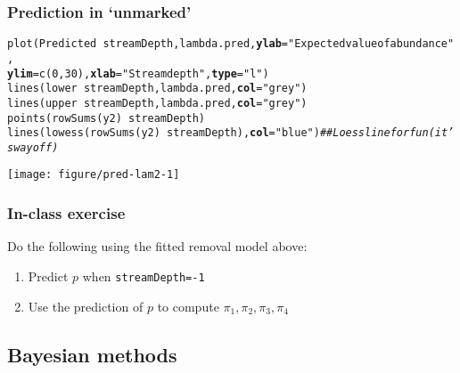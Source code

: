 \documentclass[color=usenames,dvipsnames]{beamer}\usepackage[]{graphicx}\usepackage[]{color}
\makeatletter
\newcommand{\hlnum}[1]{\textcolor[rgb]{0.69,0.494,0}{#1}}%
\newcommand{\hlstr}[1]{\textcolor[rgb]{0.749,0.012,0.012}{#1}}%
\newcommand{\hlcom}[1]{\textcolor[rgb]{0.514,0.506,0.514}{\textit{#1}}}%
\newcommand{\hlopt}[1]{\textcolor[rgb]{0,0,0}{#1}}%
\newcommand{\hlstd}[1]{\textcolor[rgb]{0,0,0}{#1}}%
\newcommand{\hlkwc}[1]{\textcolor[rgb]{0,0,0}{\textbf{#1}}}%
\newcommand{\hlkwd}[1]{\textcolor[rgb]{0.004,0.004,0.506}{#1}}%
\newenvironment{kframe}{%
 \def\at@end@of@kframe{}%
 \ifinner\ifhmode%
  \def\at@end@of@kframe{\end{minipage}}%
  \begin{minipage}{\columnwidth}%
 \fi\fi%
 \def\FrameCommand##1{\hskip\@totalleftmargin \hskip-\fboxsep
 \colorbox{shadecolor}{##1}\hskip-\fboxsep
     \hskip-\linewidth \hskip-\@totalleftmargin \hskip\columnwidth}%
 \MakeFramed {\advance\hsize-\width
   \@totalleftmargin\z@ \linewidth\hsize
   \@setminipage}}%
 {\par\unskip\endMakeFramed%
 \at@end@of@kframe}
\newenvironment{knitrout}{}{} %
\makeatother
\begin{document}
\begin{frame}[fragile]
  \frametitle{Prediction in `unmarked'}
\begin{knitrout}\tiny
{}\color{fgcolor}\begin{kframe}
\begin{alltt}
\hlkwd{plot}\hlstd{(Predicted} \hlopt{~} \hlstd{streamDepth, lambda.pred,} \hlkwc{ylab}\hlstd{=}\hlstr{"Expected value of abundance"}\hlstd{,}
     \hlkwc{ylim}\hlstd{=}\hlkwd{c}\hlstd{(}\hlnum{0}\hlstd{,}\hlnum{30}\hlstd{),} \hlkwc{xlab}\hlstd{=}\hlstr{"Stream depth"}\hlstd{,} \hlkwc{type}\hlstd{=}\hlstr{"l"}\hlstd{)}
\hlkwd{lines}\hlstd{(lower} \hlopt{~} \hlstd{streamDepth, lambda.pred,} \hlkwc{col}\hlstd{=}\hlstr{"grey"}\hlstd{)}
\hlkwd{lines}\hlstd{(upper} \hlopt{~} \hlstd{streamDepth, lambda.pred,} \hlkwc{col}\hlstd{=}\hlstr{"grey"}\hlstd{)}
\hlkwd{points}\hlstd{(}\hlkwd{rowSums}\hlstd{(y2)}\hlopt{~}\hlstd{streamDepth)}
\hlkwd{lines}\hlstd{(}\hlkwd{lowess}\hlstd{(}\hlkwd{rowSums}\hlstd{(y2)}\hlopt{~}\hlstd{streamDepth),} \hlkwc{col}\hlstd{=}\hlstr{"blue"}\hlstd{)}  \hlcom{## Loess line for fun (it's way off)}
\end{alltt}
\end{kframe}

{\centering \texttt{[image: figure/pred-lam2-1]} 

}



\end{knitrout}
\end{frame}







\begin{frame}[fragile]
  \frametitle{In-class exercise}
  Do the following using the fitted removal model above:
  \begin{enumerate}
    \normalsize
    \item Predict $p$ when \verb+streamDepth=-1+
    \item Use the prediction of $p$ to compute $\pi_1, \pi_2, \pi_3, \pi_4$
  \end{enumerate}
\end{frame}


\subsection{Bayesian methods}
\end{document}
